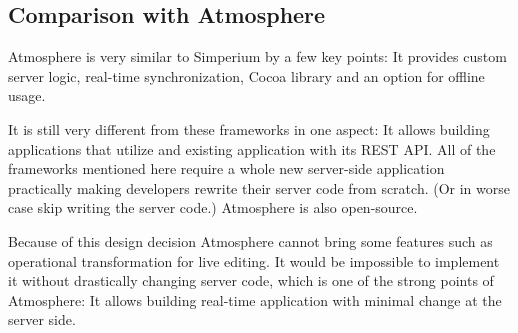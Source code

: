 \subsection{Comparison with Atmosphere}

Atmosphere is very similar to Simperium by a few key points: It provides custom server logic, real-time synchronization, Cocoa library and an option for offline usage.

It is still very different from these frameworks in one aspect: It allows building applications that utilize and existing application with its REST API. All of the frameworks mentioned here require a whole new server-side application practically making developers rewrite their server code from scratch. (Or in worse case skip writing the server code.) Atmosphere is also open-source.

Because of this design decision Atmosphere cannot bring some features such as operational transformation for live editing. It would be impossible to implement it without drastically changing server code, which is one of the strong points of Atmosphere: It allows building real-time application with minimal change at the server side.